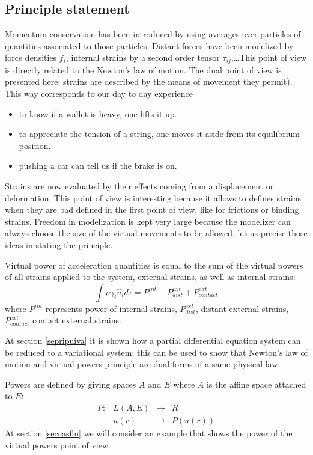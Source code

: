 \documentclass[12pt]{book}
\begin{document}
\subsection{Principle statement}
Momentum conservation has been introduced by using averages over particles of
quantities associated to those particles. Distant forces have been modelized
by force densities $f_i$, internal strains by a second order tensor
$\tau_{ij}$,\dots This point of view is directly related to the
Newton's law of motion. The dual point of view is presented here:
strains are 
described by the means of movement they permit\cite{ma:equad:Dautray1}).
This way corresponds to our day to day experience
\begin{itemize}
\item to know if a wallet is heavy, one lifts it up.
\item to appreciate the tension of a string, one moves it aside from its
  equilibrium position.
\item pushing a car can tell us if the brake is on.
\end{itemize}
Strains are now evaluated by their effects coming from a displacement or
deformation.  
This point of view is interesting because it allows to defines strains when
they are bad defined in the first point of view, like for frictions or binding
strains. Freedom in modelization is kept very large because the modelizer can
always choose the size of the virtual movements to be allowed. let us precise
those ideas in stating the principle.
\begin{prin}
Virtual power of acceleration quantities is equal to the sum of the virtual
powers of all strains applied to the system, external strains, as well as
internal strains:
\begin{equation}
\int \rho \gamma_i \hat{u}_i
d\tau=P^{int}+P^{ext}_{dist}+P^{ext}_{contact} 
\end{equation}
where $P^{int}$ represents power of internal strains, $P^{ext}_{dist}$, distant
external strains, $P^{ext}_{contact}$ contact external strains.
\end{prin}
At section \ref{sepripuiva} it is shown how a partial differential equation
system can be reduced to a variational system: this can be used to show that
Newton's law of motion and virtual powers principle are dual forms of
a same physical law.


Powers are defined by giving spaces $A$ and $E$ where $A$ is the affine space
attached to $E$:
\begin{equation}
\begin{array}{llll}
P:&L(A,E)&\longrightarrow &R\\
  &u(r)&\longrightarrow &P(u(r))
\end{array}
\end{equation}
At section \ref{seccasflu} we will consider an example that shows the power of
the virtual powers point of view.
\end{document}
